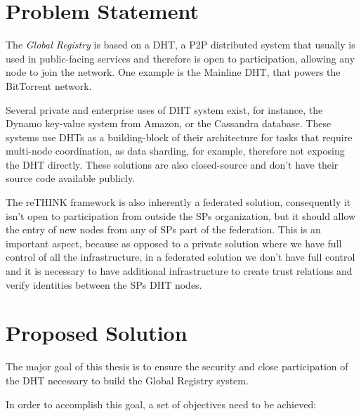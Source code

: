 \section{Problem Statement}
\label{section:problem-statement}

The \textit{Global Registry} is based on a \ac{DHT}, a \ac{P2P} distributed system  that usually is used in public-facing services and therefore is open to participation, allowing any node to join the network.
One example is the Mainline \ac{DHT}, that powers the BitTorrent network.

Several private and enterprise uses of DHT system exist, for instance, the Dynamo\cite{dynamo2007} key-value system from Amazon, or the Cassandra\cite{cassandra2010} database.
These systems use \acp{DHT} as a building-block of their architecture for tasks that require multi-node coordination, as data sharding, for example, therefore not exposing the \ac{DHT} directly.
These solutions are also closed-source and don't have their source code available publicly.

The reTHINK framework is also inherently a federated solution, consequently it isn't open to participation from outside the \acp{SP} organization, but it should allow the entry of new nodes from any of \acp{SP} part of the federation.
This is an important aspect, because as opposed to a private solution where we have full control of all the infrastructure, in a federated solution we don't have full control and it is necessary to have additional infrastructure to create trust relations and verify identities between the \acp{SP} \ac{DHT} nodes.

\section{Proposed Solution}
\label{section:proposed}

The major goal of this thesis is to ensure the security and close participation of the \ac{DHT} necessary to build the Global Registry system.

In order to accomplish this goal, a set of objectives need to be achieved:

